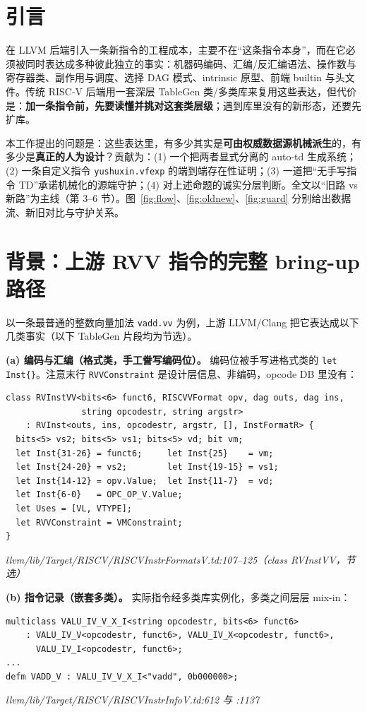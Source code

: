 \documentclass[11pt,UTF8,fontset=none]{ctexart}
\newcommand{\fcite}[1]{{\footnotesize\itshape\textcolor{framegray}{#1}}}
\begin{document}
\section{引言}
在 LLVM 后端引入一条新指令的工程成本，主要不在“这条指令本身”，而在它必须被同时表达成多种彼此独立的事实：机器码编码、汇编/反汇编语法、操作数与寄存器类、副作用与调度、选择 DAG 模式、intrinsic 原型、前端 builtin 与头文件。传统 RISC-V 后端用一套深层 TableGen 类/多类库来复用这些表达，但代价是：\textbf{加一条指令前，先要读懂并挑对这套类层级}；遇到库里没有的新形态，还要先扩库。

本工作提出的问题是：这些表达里，有多少其实是\textbf{可由权威数据源机械派生}的，有多少是\textbf{真正的人为设计}？贡献为：(1) 一个把两者显式分离的 auto-td 生成系统；(2) 一条自定义指令 \texttt{yushuxin.vfexp} 的端到端存在性证明；(3) 一道把“无手写指令 TD”承诺机械化的源端守护；(4) 对上述命题的诚实分层判断。全文以“旧路 vs 新路”为主线（第 3–6 节）。图~\ref{fig:flow}、\ref{fig:oldnew}、\ref{fig:guard} 分别给出数据流、新旧对比与守护关系。

\section{背景：上游 RVV 指令的完整 bring-up 路径}
以一条最普通的整数向量加法 \texttt{vadd.vv} 为例，上游 LLVM/Clang 把它表达成以下几类事实（以下 TableGen 片段均为节选）。

\textbf{(a) 编码与汇编（格式类，手工誊写编码位）。} 编码位被手写进格式类的 \texttt{let Inst\{\}}。注意末行 \texttt{RVVConstraint} 是设计层信息、非编码，opcode DB 里没有：
\begin{lstlisting}
class RVInstVV<bits<6> funct6, RISCVVFormat opv, dag outs, dag ins,
               string opcodestr, string argstr>
    : RVInst<outs, ins, opcodestr, argstr, [], InstFormatR> {
  bits<5> vs2; bits<5> vs1; bits<5> vd; bit vm;
  let Inst{31-26} = funct6;     let Inst{25}    = vm;
  let Inst{24-20} = vs2;        let Inst{19-15} = vs1;
  let Inst{14-12} = opv.Value;  let Inst{11-7}  = vd;
  let Inst{6-0}   = OPC_OP_V.Value;
  let Uses = [VL, VTYPE];
  let RVVConstraint = VMConstraint;
}
\end{lstlisting}
\fcite{llvm/lib/Target/RISCV/RISCVInstrFormatsV.td:107--125（class RVInstVV，节选）}

\textbf{(b) 指令记录（嵌套多类）。} 实际指令经多类库实例化，多类之间层层 mix-in：
\begin{lstlisting}
multiclass VALU_IV_V_X_I<string opcodestr, bits<6> funct6>
    : VALU_IV_V<opcodestr, funct6>, VALU_IV_X<opcodestr, funct6>,
      VALU_IV_I<opcodestr, funct6>;
...
defm VADD_V : VALU_IV_V_X_I<"vadd", 0b000000>;
\end{lstlisting}
\fcite{llvm/lib/Target/RISCV/RISCVInstrInfoV.td:612 与 :1137}
\end{document}
